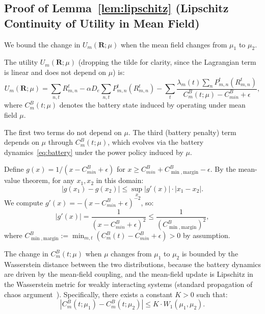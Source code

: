 \documentclass[journal]{IEEEtran}
\newcommand{\CB}{C^{B}}
\newcommand{\CBmin}{C^{B}_{min}}
\newcommand{\bfR}{\mathbf{R}}
\newcommand{\Rmn}{R_{m,n}^{t}}
\begin{document}
\subsection{Proof of Lemma~\ref{lem:lipschitz}
(Lipschitz Continuity of Utility in Mean Field)}

\begin{IEEEproof}
We bound the change in $U_m(\bfR;\mu)$ when the mean field changes from $\mu_1$ to $\mu_2$.

The utility $U_m(\bfR;\mu)$ (dropping the tilde for clarity, since the Lagrangian term is linear and does not depend on $\mu$) is:
\begin{equation}
    U_m(\bfR;\mu)
    = \sum_{n,t}\Rmn
    - \alpha D_e \sum_{n,t} P_{m,n}^t(\Rmn)
    - \sum_t \frac{\lambda_m(t)
    \sum_n P_{m,n}^t(\Rmn)}%
    {\CB_m(t;\mu)-\CBmin+\epsilon},
\end{equation}
where $\CB_m(t;\mu)$ denotes the battery state induced by operating under mean field $\mu$.

The first two terms do not depend on $\mu$. The third (battery penalty) term depends on $\mu$ through $\CB_m(t;\mu)$, which evolves via the battery dynamics~\eqref{eq:battery} under the power policy induced by $\mu$.

Define $g(x) = 1/(x - \CBmin + \epsilon)$ for $x \geq \CBmin + C^B_{\min,\mathrm{margin}} -
\epsilon$. By the mean-value theorem, for any
$x_1, x_2$ in this domain:
\begin{equation}
    |g(x_1) - g(x_2)|
    \leq \sup_{x}|g'(x)| \cdot |x_1 - x_2|.
\end{equation}
We compute $g'(x) = -(x-\CBmin+\epsilon)^{-2}$, so:
\begin{equation}
    |g'(x)|
    = \frac{1}{(x-\CBmin+\epsilon)^2}
    \leq \frac{1}{(C^B_{\min,\mathrm{margin}})^2},
\end{equation}
where $C^B_{\min,\mathrm{margin}} := \min_{m,t}(\CB_m(t) - \CBmin + \epsilon) > 0$ by assumption.

The change in $\CB_m(t;\mu)$ when $\mu$ changes from $\mu_1$ to $\mu_2$ is bounded by the Wasserstein distance between the two distributions, because the battery dynamics are driven by the mean-field coupling, and the mean-field update is Lipschitz in the Wasserstein metric for weakly interacting systems (standard propagation of chaos argument~\cite{lasry2007mfg}). Specifically, there exists a constant $K > 0$ such that:
\begin{equation}
    |\CB_m(t;\mu_1) - \CB_m(t;\mu_2)|
    \leq K \cdot W_1(\mu_1, \mu_2).
\end{equation}


\end{IEEEproof}
\end{document}
